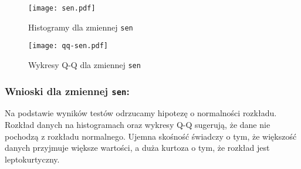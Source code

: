\documentclass[12pt,a4paper]{article}
\begin{document}
\begin{figure}[H]
    \centering
    \texttt{[image: sen.pdf]}
    \caption{Histogramy dla zmiennej \texttt{sen}}
\end{figure}
\begin{figure}[H]
    \centering
    \texttt{[image: qq-sen.pdf]}
    \caption{Wykresy Q-Q dla zmiennej \texttt{sen}}
\end{figure}

\subsubsection*{Wnioski dla zmiennej \texttt{sen}:}
Na podstawie wyników testów odrzucamy hipotezę o normalności rozkładu. Rozkład danych na histogramach oraz wykresy Q-Q sugerują, że dane nie pochodzą z rozkładu normalnego. Ujemna skośność świadczy o tym, że większość danych przyjmuje większe wartości, a duża kurtoza o tym, że rozkład jest leptokurtyczny.
\end{document}
